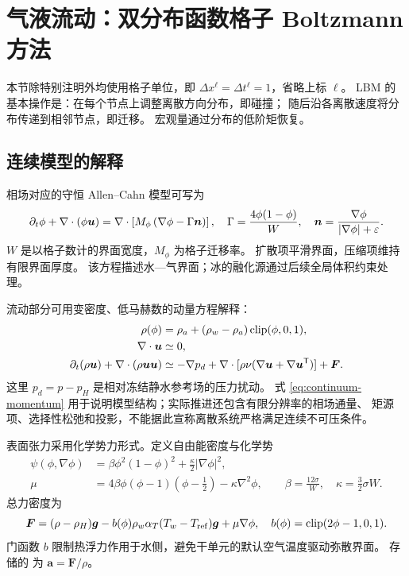 \section{气液流动：双分布函数格子 Boltzmann 方法}
\label{sec:flow}
本节除特别注明外均使用格子单位，即 $\Delta x^\ell=\Delta t^\ell=1$，省略上标 $\ell$。
LBM 的基本操作是：在每个节点上调整离散方向分布，即碰撞；
随后沿各离散速度将分布传递到相邻节点，即迁移。
宏观量通过分布的低阶矩恢复。

\subsection{连续模型的解释}
相场对应的守恒 Allen--Cahn 模型可写为
\begin{equation}
 \partial_t\phi+\nabla\cdot(\phi\bm u)
 =\nabla\cdot\left[M_\phi\left(\nabla\phi-\Gamma\bm n\right)\right],
 \quad \Gamma=\frac{4\phi(1-\phi)}{W},\quad
 \bm n=\frac{\nabla\phi}{|\nabla\phi|+\varepsilon}.
 \label{eq:ac}
\end{equation}
$W$ 是以格子数计的界面宽度，$M_\phi$ 为格子迁移率。
扩散项平滑界面，压缩项维持有限界面厚度。
该方程描述水—气界面；冰的融化源通过后续全局体积约束处理。

流动部分可用变密度、低马赫数的动量方程解释：
\begin{align}
 \rho(\phi)&=\rho_a+(\rho_w-\rho_a)\operatorname{clip}(\phi,0,1),\\
 \nabla\cdot\bm u&\simeq0,\\
 \partial_t(\rho\bm u)+\nabla\cdot(\rho\bm u\bm u)
 &\simeq-\nabla p_d+\nabla\cdot[\rho\nu(\nabla\bm u+\nabla\bm u^{\mathsf T})]
   +\bm F.
 \label{eq:continuum-momentum}
\end{align}
这里 $p_d=p-p_H$ 是相对冻结静水参考场的压力扰动。
式 \eqref{eq:continuum-momentum} 用于说明模型结构；实际推进还包含有限分辨率的相场通量、
矩源项、选择性松弛和投影，不能据此宣称离散系统严格满足连续不可压条件。

表面张力采用化学势力形式。定义自由能密度与化学势
\begin{align}
 \psi(\phi,\nabla\phi)&=\beta\phi^2(1-\phi)^2+\frac{\kappa}{2}|\nabla\phi|^2,\\
 \mu&=4\beta\phi(\phi-1)(\phi-\tfrac12)-\kappa\nabla^2\phi,\qquad
 \beta=\frac{12\sigma}{W},\quad\kappa=\frac32\sigma W.
\end{align}
总力密度为
\begin{equation}
 \bm F=(\rho-\rho_H)\bm g
 -b(\phi)\rho_w\alpha_T(T_w-T_{\rm ref})\bm g+\mu\nabla\phi,
 \quad b(\phi)=\operatorname{clip}(2\phi-1,0,1).
 \label{eq:force}
\end{equation}
门函数 $b$ 限制热浮力作用于水侧，避免干单元的默认空气温度驱动弥散界面。
存储的  为 $\bm a=\bm F/\rho$。

